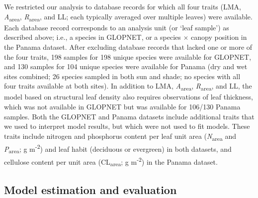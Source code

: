 \documentclass[
  12pt,
  letterpaper,
  DIV=11,
  numbers=noendperiod]{scrartcl}
\begin{document}
We restricted our analysis to database records for which all four traits
(LMA, \emph{A}\textsubscript{area}, \emph{R}\textsubscript{area}, and
LL; each typically averaged over multiple leaves) were available. Each
database record corresponds to an analysis unit (or `leaf sample') as
described above; i.e., a species in GLOPNET, or a species \(\times\)
canopy position in the Panama dataset. After excluding database records
that lacked one or more of the four traits, 198 samples for 198 unique
species were available for GLOPNET, and 130 samples for 104 unique
species were available for Panama (dry and wet sites combined; 26
species sampled in both sun and shade; no species with all four traits
available at both sites). In addition to LMA,
\emph{A}\textsubscript{area}, \emph{R}\textsubscript{area}, and LL, the
model based on structural leaf density also requires observations of
leaf thickness, which was not available in GLOPNET but was available for
106/130 Panama samples. Both the GLOPNET and Panama datasets include
additional traits that we used to interpret model results, but which
were not used to fit models. These traits include nitrogen and
phosphorus content per leaf unit area (\emph{N}\textsubscript{area} and
\emph{P}\textsubscript{area}; g m\textsuperscript{-2}) and leaf habit
(deciduous or evergreen) in both datasets, and cellulose content per
unit area (CL\textsubscript{area}; g m\textsuperscript{-2}) in the
Panama dataset.

\subsection{Model estimation and
evaluation}\label{model-estimation-and-evaluation}
\end{document}
